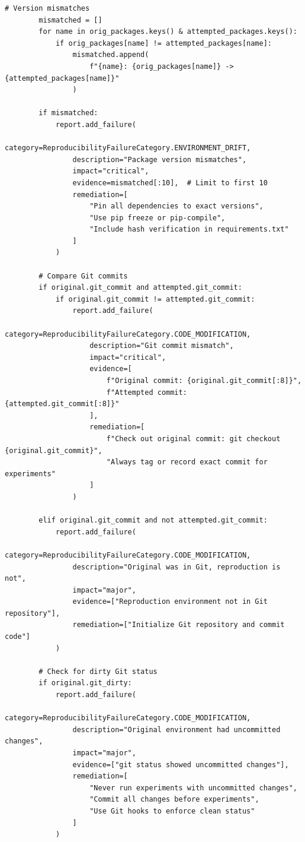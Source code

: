 \begin{lstlisting}[style=python, caption={Post-incident reproducibility audit framework}]
        # Version mismatches
        mismatched = []
        for name in orig_packages.keys() & attempted_packages.keys():
            if orig_packages[name] != attempted_packages[name]:
                mismatched.append(
                    f"{name}: {orig_packages[name]} -> {attempted_packages[name]}"
                )

        if mismatched:
            report.add_failure(
                category=ReproducibilityFailureCategory.ENVIRONMENT_DRIFT,
                description="Package version mismatches",
                impact="critical",
                evidence=mismatched[:10],  # Limit to first 10
                remediation=[
                    "Pin all dependencies to exact versions",
                    "Use pip freeze or pip-compile",
                    "Include hash verification in requirements.txt"
                ]
            )

        # Compare Git commits
        if original.git_commit and attempted.git_commit:
            if original.git_commit != attempted.git_commit:
                report.add_failure(
                    category=ReproducibilityFailureCategory.CODE_MODIFICATION,
                    description="Git commit mismatch",
                    impact="critical",
                    evidence=[
                        f"Original commit: {original.git_commit[:8]}",
                        f"Attempted commit: {attempted.git_commit[:8]}"
                    ],
                    remediation=[
                        f"Check out original commit: git checkout {original.git_commit}",
                        "Always tag or record exact commit for experiments"
                    ]
                )

        elif original.git_commit and not attempted.git_commit:
            report.add_failure(
                category=ReproducibilityFailureCategory.CODE_MODIFICATION,
                description="Original was in Git, reproduction is not",
                impact="major",
                evidence=["Reproduction environment not in Git repository"],
                remediation=["Initialize Git repository and commit code"]
            )

        # Check for dirty Git status
        if original.git_dirty:
            report.add_failure(
                category=ReproducibilityFailureCategory.CODE_MODIFICATION,
                description="Original environment had uncommitted changes",
                impact="major",
                evidence=["git status showed uncommitted changes"],
                remediation=[
                    "Never run experiments with uncommitted changes",
                    "Commit all changes before experiments",
                    "Use Git hooks to enforce clean status"
                ]
            )


\end{lstlisting}
